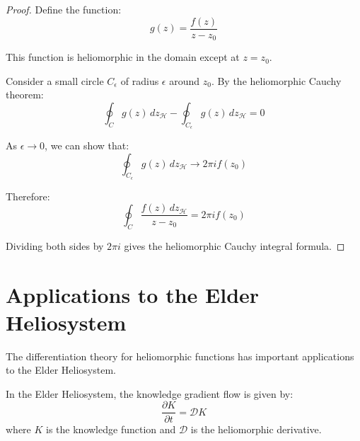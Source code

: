 \begin{proof}
Define the function:
\begin{equation}
g(z) = \frac{f(z)}{z - z_0}
\end{equation}

This function is heliomorphic in the domain except at $z = z_0$.

Consider a small circle $C_\epsilon$ of radius $\epsilon$ around $z_0$. By the heliomorphic Cauchy theorem:
\begin{equation}
\oint_{C} g(z) \, dz_{\mathcal{H}} - \oint_{C_\epsilon} g(z) \, dz_{\mathcal{H}} = 0
\end{equation}

As $\epsilon \to 0$, we can show that:
\begin{equation}
\oint_{C_\epsilon} g(z) \, dz_{\mathcal{H}} \to 2\pi i f(z_0)
\end{equation}

Therefore:
\begin{equation}
\oint_{C} \frac{f(z) \, dz_{\mathcal{H}}}{z - z_0} = 2\pi i f(z_0)
\end{equation}

Dividing both sides by $2\pi i$ gives the heliomorphic Cauchy integral formula.
\end{proof}

\section{Applications to the Elder Heliosystem}

The differentiation theory for heliomorphic functions has important applications to the Elder Heliosystem.

\begin{theorem}
In the Elder Heliosystem, the knowledge gradient flow is given by:
\begin{equation}
\frac{\partial K}{\partial t} = \mathcal{D}K
\end{equation}
where $K$ is the knowledge function and $\mathcal{D}$ is the heliomorphic derivative.
\end{theorem}


